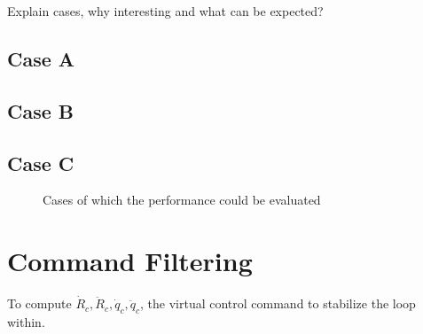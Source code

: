 Explain cases, why interesting and what can be expected?\\

\subsection{Case A}
\subsection{Case B}
\subsection{Case C}

\begin{figure}[h!]
	\centering
	\caption{Cases of which the performance could be evaluated \label{fig:routes}}
\end{figure}

\section{Command Filtering}
To compute $ \dot{R}_c, \ddot{R}_c,\dot{q}_c, \ddot{q}_c $, the virtual control command to stabilize the loop within. \cite{Farrell2009}

